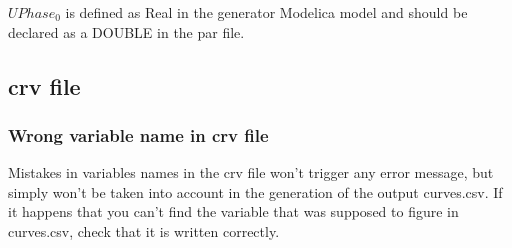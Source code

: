 \documentclass[a4paper, 12pt]{report}
\begin{document}
$UPhase_0$ is defined as Real in the generator Modelica model and should be declared as a DOUBLE in the par file.

\subsection{crv file}

\subsubsection{Wrong variable name in crv file}

Mistakes in variables names in the crv file won't trigger any error message, but simply won't be taken into account in the generation of the output curves.csv. If it happens that you can't find the variable that was supposed to figure in curves.csv, check that it is written correctly.
\end{document}

